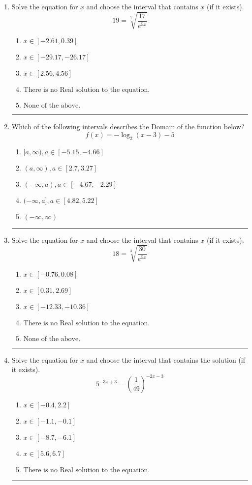 \documentclass[14pt]{extbook}
\newcommand{\litem}[1]{\item#1\hspace*{-1cm}\rule{\textwidth}{0.4pt}}
\begin{document}
\begin{enumerate}
{\begin{enumerate}[label=\Alph*.]
\end{enumerate} }
\litem{
 Solve the equation for $x$ and choose the interval that contains $x$ (if it exists).\[  19 = \sqrt[7]{\frac{17}{e^{5x}}} \]\begin{enumerate}[label=\Alph*.]
\item \( x \in [-2.61, 0.39] \)
\item \( x \in [-29.17, -26.17] \)
\item \( x \in [2.56, 4.56] \)
\item \( \text{There is no Real solution to the equation.} \)
\item \( \text{None of the above.} \)

\end{enumerate} }
\litem{
Which of the following intervals describes the Domain of the function below?\[ f(x) = -\log_2{(x-3)}-5 \]\begin{enumerate}[label=\Alph*.]
\item \( [a, \infty), a \in [-5.15, -4.66] \)
\item \( (a, \infty), a \in [2.7, 3.27] \)
\item \( (-\infty, a), a \in [-4.67, -2.29] \)
\item \( (-\infty, a], a \in [4.82, 5.22] \)
\item \( (-\infty, \infty) \)

\end{enumerate} }
\litem{
 Solve the equation for $x$ and choose the interval that contains $x$ (if it exists).\[  18 = \sqrt[3]{\frac{30}{e^{5x}}} \]\begin{enumerate}[label=\Alph*.]
\item \( x \in [-0.76, 0.08] \)
\item \( x \in [0.31, 2.69] \)
\item \( x \in [-12.33, -10.36] \)
\item \( \text{There is no Real solution to the equation.} \)
\item \( \text{None of the above.} \)

\end{enumerate} }
\litem{
Solve the equation for $x$ and choose the interval that contains the solution (if it exists).\[ 5^{-3x+3} = \left(\frac{1}{49}\right)^{-2x-3} \]\begin{enumerate}[label=\Alph*.]
\item \( x \in [-0.4, 2.2] \)
\item \( x \in [-1.1, -0.1] \)
\item \( x \in [-8.7, -6.1] \)
\item \( x \in [5.6, 6.7] \)
\item \( \text{There is no Real solution to the equation.} \)


\end{enumerate}}
\end{enumerate}
\end{document}
